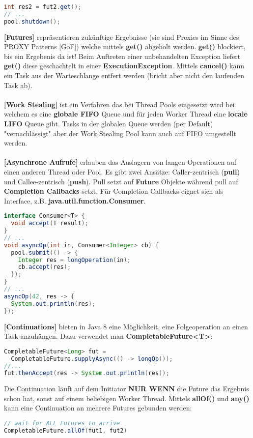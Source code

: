 \documentclass[8pt]{extarticle}
\let\oldtextbf\textbf
\renewcommand{\textbf}{\tiny\oldtextbf}
\begin{document}
\begin{multicols*}{5}
\begin{lstlisting}[language=java]
int res2 = fut2.get();
// ...
pool.shutdown();
\end{lstlisting}
\textbf{[Futures]} repräsentieren zukünftige Ergebnisse (sie sind Proxies im Sinne des PROXY Patterns [GoF]) welche mittels \textbf{get()} abgeholt werden. \textbf{get()} blockiert, bis ein Ergebenis da ist! Beim Auftreten einer unbehandelten Exception liefert \textbf{get()} diese geschachtelt in einer \textbf{ExecutionException}. Mittels \textbf{cancel()} kann ein Task aus der Warteschlange entfert werden (bricht aber nicht den laufenden Task ab).\\\\
\textbf{[Work Stealing]} ist ein Verfahren das bei Thread Pools eingesetzt wird bei welchem es eine \textbf{globale FIFO} Queue und für jeden Worker Thread eine \textbf{locale LIFO} Queue gibt. Tasks in der globalen Queue werden (per Default) "vernachlässigt" aber der Work Stealing Pool kann auch auf FIFO umgestellt werden.\\\\
\textbf{[Asynchrone Aufrufe]} erlauben das Auslagern von langen Operationen auf einen anderen Thread oder Pool. Es gibt zwei Ansätze: Caller-zentrisch (\textbf{pull}) und Callee-zentrisch (\textbf{push}). Pull setzt auf \textbf{Future} Objekte während pull auf \textbf{Completion Callbacks} setzt. Für Completion Callbacks eignet sich als Interface, z.B. \textbf{java.util.function.Consumer}.
\begin{lstlisting}[language=java]
interface Consumer<T> {
  void accept(T result);
}
// ...
void asyncOp(int in, Consumer<Integer> cb) {
  pool.submit(() -> {
    Integer res = longOperation(in);
    cb.accept(res);
  });
}
// ...
asyncOp(42, res -> {
  System.out.println(res);
});
\end{lstlisting}
\textbf{[Continuations]} bieten in Java 8 eine Möglichkeit, eine Folgeoperation an einen Task anzuhängen. Dazu verwendet man \textbf{CompletableFuture<T>}:
\begin{lstlisting}[language=java]
CompletableFuture<Long> fut = 
  CompletableFuture.supplyAsync(() -> longOp());
//...
fut.thenAccept(res -> System.out.println(res));
\end{lstlisting}
Die Continuation läuft auf dem Initiator \textbf{NUR WENN} die Future das Ergebnis schon hat, sonst auf einem beliebigen Worker Thread. Mittels \textbf{allOf()} und \textbf{any()} kann eine Continuation an mehrere Futures gebunden werden:
\begin{lstlisting}[language=java]
// wait for ALL Futures to arrive
CompletableFuture.allOf(fut1, fut2)

\end{lstlisting}
\end{multicols*}
\end{document}
